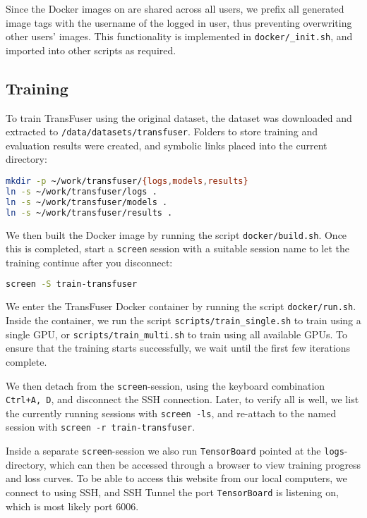 Since the Docker images on \nap are shared across all users,
we prefix all generated image tags with the username of the logged in user,
thus preventing overwriting other users' images.
This functionality is implemented in \texttt{docker/\_init.sh},
and imported into other scripts as required.

\subsection{Training}

To train TransFuser using the original dataset,
the dataset was downloaded and extracted to
\texttt{/data/datasets/transfuser}.
Folders to store training and evaluation results were created,
and symbolic links placed into the current directory:
\begin{lstlisting}[language=bash]
mkdir -p ~/work/transfuser/{logs,models,results}
ln -s ~/work/transfuser/logs .
ln -s ~/work/transfuser/models .
ln -s ~/work/transfuser/results .
\end{lstlisting}

We then built the Docker image by running the script \texttt{docker/build.sh}.
Once this is completed,
start a \texttt{screen} session with a suitable session name
to let the training continue after you disconnect:
\begin{lstlisting}[language=bash]
screen -S train-transfuser
\end{lstlisting}

We enter the TransFuser Docker container by running the script \texttt{docker/run.sh}.
Inside the container,
we run the script \texttt{scripts/train\_single.sh} to train using a single GPU,
or \texttt{scripts/train\_multi.sh} to train using all available GPUs.
To ensure that the training starts successfully,
we wait until the first few iterations complete.

We then detach from the \texttt{screen}-session,
using the keyboard combination \texttt{Ctrl+A, D},
and disconnect the SSH connection.
Later, to verify all is well,
we list the currently running sessions with \texttt{screen -ls},
and re-attach to the named session with \texttt{screen -r train-transfuser}.

Inside a separate \texttt{screen}-session
we also run \texttt{TensorBoard} pointed at the \texttt{logs}-directory,
which can then be accessed through a browser to view training progress and loss curves.
To be able to access this website from our local computers,
we connect to \nap using SSH,
and SSH Tunnel the port \texttt{TensorBoard} is listening on,
which is most likely port 6006.

